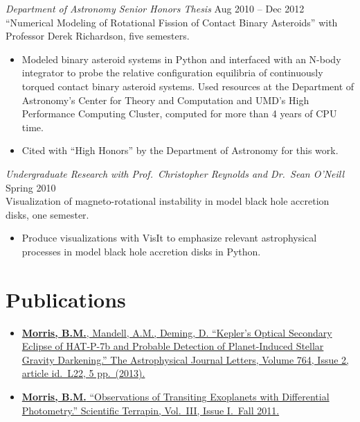 \documentclass[margin]{res}
\begin{document}
\begin{resume}
      {\sl Department of Astronomy Senior Honors Thesis} \hfill Aug 2010 -- Dec 2012 \\
                ``Numerical Modeling of Rotational Fission of Contact Binary Asteroids'' with Professor Derek Richardson, five semesters. 
                 \begin{itemize}   
                 \item Modeled binary asteroid systems in Python and interfaced with an N-body integrator to probe the relative configuration equilibria of continuously torqued 
contact binary asteroid systems. Used resources at the Department of Astronomy's Center for Theory and Computation 
and UMD's High Performance Computing Cluster, computed for more than 4 years of CPU time. 
                \item  Cited with ``High Honors'' by the Department of Astronomy for this work.
                \end{itemize}

                {\sl Undergraduate Research with Prof.\ Christopher Reynolds and Dr.\ Sean O'Neill} \hfill        Spring 2010 \\
                Visualization of magneto-rotational instability in model black hole accretion disks, one semester.
                  \begin{itemize}  
                   \item Produce visualizations with VisIt to emphasize relevant astrophysical processes in model black hole accretion disks in Python. \\
                   \end{itemize} 

\section{Publications} 
                 \begin{itemize}   
                  \item \href{http://adsabs.harvard.edu/abs/2013ApJ...764L..22M}{\textbf{Morris, B.M.}, Mandell, A.M., Deming, D. ``Kepler's Optical Secondary Eclipse of HAT-P-7b and Probable Detection of Planet-Induced Stellar Gravity Darkening.'' The Astrophysical Journal Letters, Volume 764, Issue 2, article id.\ L22, 5 pp.\ (2013).}
		\item \href{http://www.scientificterrapin.umd.edu/Fall2011.php}{\textbf{Morris, B.M.} ``Observations of Transiting Exoplanets with Differential Photometry.'' Scientific Terrapin, Vol.\ III, Issue I.\ Fall 2011.}\\
                 \end{itemize}


\end{resume}
\end{document}
